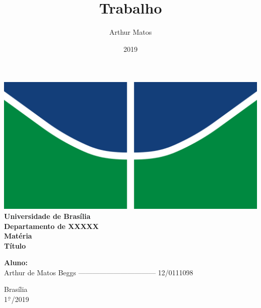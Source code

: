 \documentclass{article}
\title{Trabalho}
\author{Arthur Matos}
\date{2019}
\newcommand{\ubar}[1]{\underaccent{\bar}{#1}}
\begin{document}
\begin{titlepage}
    \begin{center}
        \centering
        \includegraphics[width=.7\linewidth]{images/logo_unb.png}\\[0.5cm]
        {\large \textbf{Universidade de Brasília}}\\[0.2cm]
        {\large \textbf{Departamento de XXXXX}}\\[0.2cm]
        {\large \textbf{Matéria}}\\[4.8cm]
        {\bf \huge {Título}}\\[0.2cm]
        {\bf \large {}}
    \end{center}

    \vspace{5cm}
    \hspace{2cm} {\noindent \bf \large {Aluno:}}\\
    \vspace{0.8cm}
    \hspace{2.35cm} {\large Arthur de Matos Beggs --------------------------------- 12/0111098}\\[1cm]

    \begin{center}
        {\large Brasília}\\
        {\large 1$^{\ubar{\circ}}$/2019}
    \end{center}

\end{titlepage}
\clearpage
\setcounter{page}{2}
\clearpage


\end{document}
